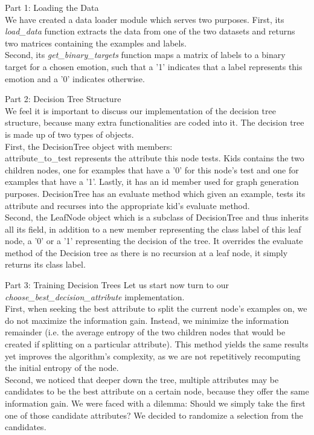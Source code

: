 
Part 1: Loading the Data\\
We have created a data loader module which serves two purposes.
First, its \emph{load\_data} function extracts the data from one of the two datasets
and returns two matrices containing the examples and labels. \\
Second, its \emph{get\_binary\_targets} function maps a matrix of labels to a binary target for a chosen emotion,
such that a '1' indicates that a label represents this emotion and a '0' indicates otherwise.

Part 2: Decision Tree Structure \\
We feel it is important to discuss our implementation of the decision tree structure,
because many extra functionalities are coded into it. The decision tree is made up of two types of objects.\\
First, the DecisionTree object with members:\\
attribute\_to\_test represents the attribute this node tests. Kids contains the two children nodes, one for
examples that have a '0' for this node's test and one for examples that have a '1'. Lastly, it has an id member used for graph
generation purposes. DecisionTree has an evaluate method which given an example, tests its attribute and recurses into
the appropriate kid's evaluate method. \\
Second, the LeafNode object which is a subclass of DecisionTree and thus inherits all its field, in addition to a new
member representing the class label of this leaf node, a '0' or a '1' representing the decision of the tree.
It overrides the evaluate method of the Decision tree as there is no recursion at a leaf node, it simply returns its class label.




Part 3: Training Decision Trees
Let us start now turn to our \emph{choose\_best\_decision\_attribute} implementation. \\
First, when seeking the best attribute to split the current node's examples on, we do not maximize the information gain.
Instead, we minimize the information remainder (i.e. the average entropy of the two children nodes
that would be created if splitting on a particular attribute).
This method yields the same results yet
improves the algorithm's complexity, as we are not repetitively recomputing the initial entropy of the node.\\
Second, we noticed that deeper down the tree, multiple attributes may be candidates to be the best attribute on a certain node,
because they offer the same information gain. We were faced with a dilemma: Should we simply
take the first one of those candidate attributes? We decided to randomize a selection from the candidates.

